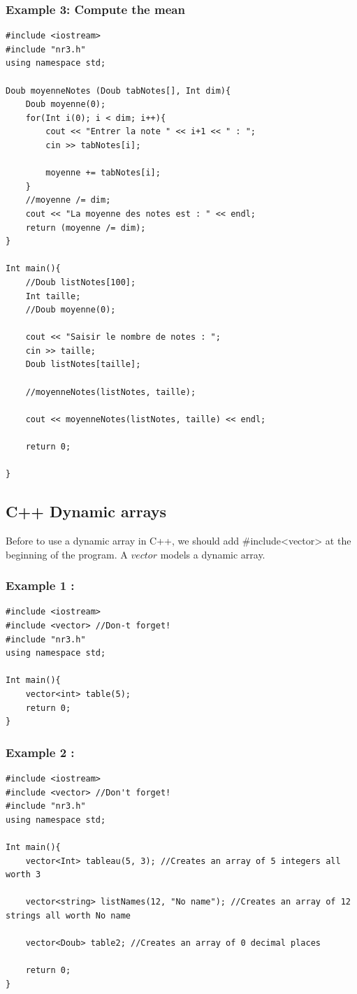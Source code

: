 \documentclass[12pt]{report}
\begin{document}
\subsubsection{Example 3: Compute the mean }
\begin{lstlisting}[style=CStyle]
#include <iostream>
#include "nr3.h"
using namespace std;

Doub moyenneNotes (Doub tabNotes[], Int dim){
	Doub moyenne(0);
	for(Int i(0); i < dim; i++){
		cout << "Entrer la note " << i+1 << " : ";
		cin >> tabNotes[i];
		
		moyenne += tabNotes[i];
	}
	//moyenne /= dim;
	cout << "La moyenne des notes est : " << endl;
	return (moyenne /= dim);
}

Int main(){
	//Doub listNotes[100];
	Int taille;
	//Doub moyenne(0);
	
	cout << "Saisir le nombre de notes : ";
	cin >> taille;
	Doub listNotes[taille];
	
	//moyenneNotes(listNotes, taille);
	
	cout << moyenneNotes(listNotes, taille) << endl;
	
	return 0;
	
}

\end{lstlisting}

\subsection{C++ Dynamic arrays}
Before to use a dynamic array in C++, we should add \#include<vector> at the beginning of the program. A $vector$ models a dynamic array.

\subsubsection{Example 1 :}
\begin{lstlisting}[style=CStyle]
#include <iostream>
#include <vector> //Don-t forget!
#include "nr3.h"
using namespace std;

Int main(){
	vector<int> table(5);
	return 0;
}

\end{lstlisting}

\subsubsection{Example 2 :}
\begin{lstlisting}[style=CStyle]
#include <iostream>
#include <vector> //Don't forget!
#include "nr3.h"
using namespace std;

Int main(){
	vector<Int> tableau(5, 3); //Creates an array of 5 integers all worth 3
    
    vector<string> listNames(12, "No name"); //Creates an array of 12 strings all worth No name 
    
    vector<Doub> table2; //Creates an array of 0 decimal places
    
	return 0;
}

\end{lstlisting}
\end{document}
